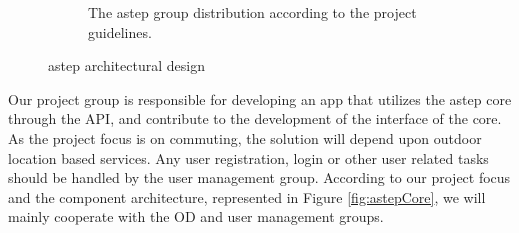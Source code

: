\begin{figure}[h!]
\begin{subfigure}[b]{0.56\textwidth}
		\caption{The \gls{astep} group distribution according to the project guidelines.}
		\label{fig:astepGroups}
	\end{subfigure}
	\caption{\gls{astep} architectural design}
	\label{fig:astepArchitecture}
\end{figure}

Our project group is responsible for developing an app that utilizes the \gls{astep} core through the API, and contribute to the development of the interface of the core.
As the project focus is on commuting, the solution will depend upon outdoor location based services.
Any user registration, login or other user related tasks should be handled by the user management group.
According to our project focus and the component architecture, represented in Figure \ref{fig:astepCore}, we will mainly cooperate with the OD and user management groups.

